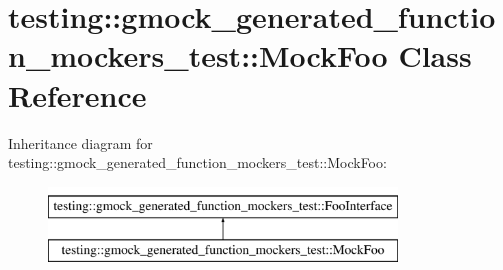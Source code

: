 \hypertarget{classtesting_1_1gmock__generated__function__mockers__test_1_1MockFoo}{}\section{testing\+::gmock\+\_\+generated\+\_\+function\+\_\+mockers\+\_\+test\+::Mock\+Foo Class Reference}
\label{classtesting_1_1gmock__generated__function__mockers__test_1_1MockFoo}
Inheritance diagram for testing\+::gmock\+\_\+generated\+\_\+function\+\_\+mockers\+\_\+test\+::Mock\+Foo\+:\begin{figure}[H]
\begin{center}
\leavevmode
\includegraphics[height=2.000000cm]{classtesting_1_1gmock__generated__function__mockers__test_1_1MockFoo}
\end{center}
\end{figure}

